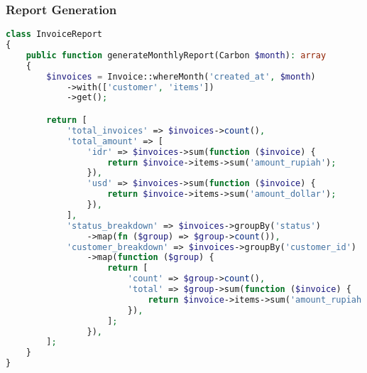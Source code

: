 \documentclass[a4paper]{report}
\begin{document}
\subsubsection{Report Generation}
\begin{lstlisting}[language=PHP]
class InvoiceReport
{
    public function generateMonthlyReport(Carbon $month): array
    {
        $invoices = Invoice::whereMonth('created_at', $month)
            ->with(['customer', 'items'])
            ->get();

        return [
            'total_invoices' => $invoices->count(),
            'total_amount' => [
                'idr' => $invoices->sum(function ($invoice) {
                    return $invoice->items->sum('amount_rupiah');
                }),
                'usd' => $invoices->sum(function ($invoice) {
                    return $invoice->items->sum('amount_dollar');
                }),
            ],
            'status_breakdown' => $invoices->groupBy('status')
                ->map(fn ($group) => $group->count()),
            'customer_breakdown' => $invoices->groupBy('customer_id')
                ->map(function ($group) {
                    return [
                        'count' => $group->count(),
                        'total' => $group->sum(function ($invoice) {
                            return $invoice->items->sum('amount_rupiah');
                        }),
                    ];
                }),
        ];
    }
}
\end{lstlisting}
\end{document}
